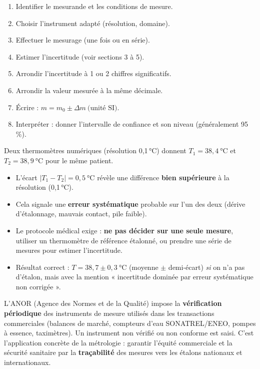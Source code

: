 \documentclass[11pt]{article}
\begin{document}
\begin{methode}
\begin{enumerate}
\item Identifier le mesurande et les conditions de mesure.
\item Choisir l'instrument adapté (résolution, domaine).
\item Effectuer le mesurage (une fois ou en série).
\item Estimer l'incertitude (voir sections 3 à 5).
\item Arrondir l'incertitude à 1 ou 2 chiffres significatifs.
\item Arrondir la valeur mesurée à la même décimale.
\item Écrire : $m = m_0 \pm \Delta m\ \text{(unité SI)}$.
\item Interpréter : donner l'intervalle de confiance et son niveau (généralement 95\,\%).
\end{enumerate}
\end{methode}

\begin{exemplebox}
Deux thermomètres numériques (résolution 0,1\,°C) donnent $T_1 = 38,4\ \mathrm{°C}$ et $T_2 = 38,9\ \mathrm{°C}$ pour le même patient.
\begin{itemize}
\item L'écart $|T_1 - T_2| = 0,5\ \mathrm{°C}$ révèle une différence \textbf{bien supérieure} à la résolution (0,1\,°C).
\item Cela signale une \textbf{erreur systématique} probable sur l'un des deux (dérive d'étalonnage, mauvais contact, pile faible).
\item Le protocole médical exige : \textbf{ne pas décider sur une seule mesure}, utiliser un thermomètre de référence étalonné, ou prendre une série de mesures pour estimer l'incertitude.
\item Résultat correct : $T = 38,7 \pm 0,3\ \mathrm{°C}$ (moyenne $\pm$ demi-écart) \emph{si} on n'a pas d'étalon, mais avec la mention « incertitude dominée par erreur systématique non corrigée ».
\end{itemize}
\end{exemplebox}

\begin{savaistu}
L'ANOR (Agence des Normes et de la Qualité) impose la \textbf{vérification périodique} des instruments de mesure utilisés dans les transactions commerciales (balances de marché, compteurs d'eau SONATREL/ENEO, pompes à essence, taximètres). Un instrument non vérifié ou non conforme est saisi. C'est l'application concrète de la métrologie : garantir l'équité commerciale et la sécurité sanitaire par la \textbf{traçabilité} des mesures vers les étalons nationaux et internationaux.
\end{savaistu}
\end{document}
